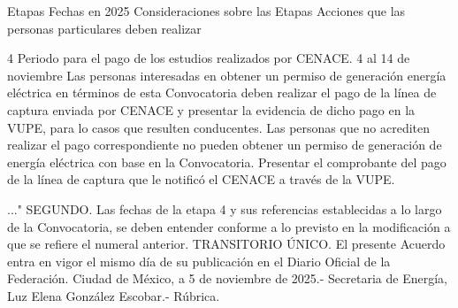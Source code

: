  Etapas
 Fechas en 2025
 Consideraciones sobre las Etapas
 Acciones que las personas particulares deben realizar
 
 4
 Periodo para el pago de los estudios realizados por CENACE.
 4 al 14 de noviembre
 Las personas interesadas en obtener un permiso de generación energía eléctrica en términos de esta Convocatoria deben realizar el pago de la línea de captura enviada por CENACE y presentar la evidencia de dicho pago en la VUPE, para lo casos que resulten conducentes.
Las personas que no acrediten realizar el pago correspondiente no pueden obtener un permiso de generación de energía eléctrica con base en la Convocatoria.
 Presentar el comprobante del pago de la línea de captura que le notificó el CENACE a través de la VUPE.
 
 
..."
SEGUNDO. Las fechas de la etapa 4 y sus referencias establecidas a lo largo de la Convocatoria, se deben entender conforme a lo previsto en la modificación a que se refiere el numeral anterior.
TRANSITORIO
ÚNICO. El presente Acuerdo entra en vigor el mismo día de su publicación en el Diario Oficial  de la Federación.
Ciudad de México, a 5 de noviembre de 2025.- Secretaria de Energía, Luz Elena González Escobar.- Rúbrica.\par
\endgroup
